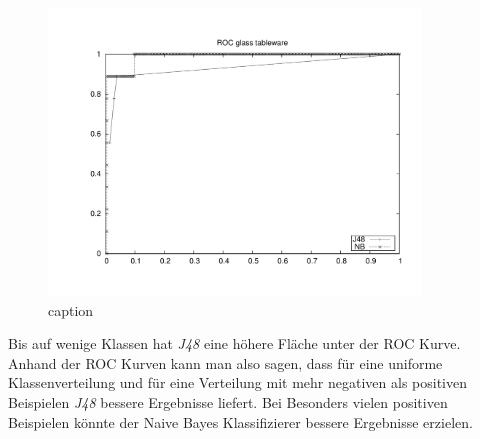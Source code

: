 \begin{figure}[htbp]
	\centering
		\includegraphics[height=3in]{pics/a3/ROC_glass_tableware.pdf}
	\caption{caption}
	\label{fig:pics_a3_ROC_glass_tableware}
\end{figure}

Bis auf wenige Klassen hat \emph{J48} eine h\"ohere Fl\"ache unter der ROC Kurve.
Anhand der ROC Kurven kann man also sagen, dass f\"ur eine uniforme Klassenverteilung und f\"ur eine Verteilung mit mehr negativen als positiven Beispielen \emph{J48} bessere Ergebnisse liefert. Bei Besonders vielen positiven Beispielen k\"onnte der Naive Bayes Klassifizierer bessere Ergebnisse erzielen.

